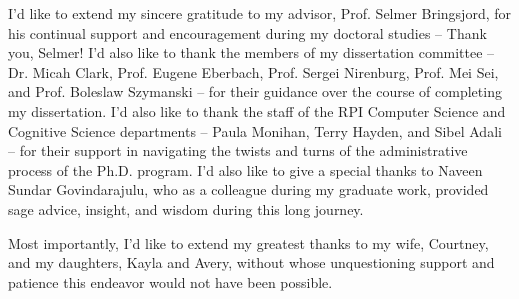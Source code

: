  

I'd like to extend my sincere gratitude to my advisor, Prof. Selmer Bringsjord, for his continual support and encouragement during my doctoral studies -- Thank you, Selmer!  I'd also like to thank the members of my dissertation committee -- Dr. Micah Clark, Prof. Eugene Eberbach, Prof. Sergei Nirenburg, Prof. Mei Sei, and Prof. Boleslaw Szymanski -- for their guidance over the course of completing my dissertation.  I'd also like to thank the staff of the RPI Computer Science and Cognitive Science departments -- Paula Monihan, Terry Hayden, and Sibel Adali -- for their support in navigating the twists and turns of the administrative process of the Ph.D. program.  I'd also like to give a special thanks to Naveen Sundar Govindarajulu, who as a colleague during my graduate work, provided sage advice, insight, and wisdom during this long journey.  

Most importantly, I'd like to extend my greatest thanks to my wife, Courtney, and my daughters, Kayla and Avery, without whose unquestioning support and patience this endeavor would not have been possible.